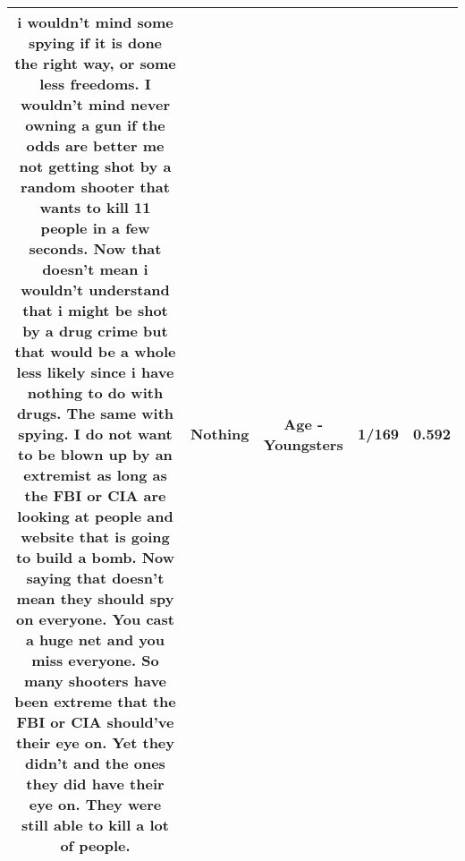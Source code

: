 \documentclass[11pt]{article}
\newlength\mylength
\begin{document}
\begin{center}
\begin{longtable}{|C{.65\mylength}|C{.30\mylength}|C{.12\mylength}|C{.12\mylength}|C{.12\mylength}|}
  \small i wouldn't mind some spying if it is done the right way, or some less freedoms. I wouldn't mind never owning a gun if the odds are better me not getting shot by a random shooter that wants to kill 11 people in a few seconds. Now that doesn't mean i wouldn't understand that i might be shot by a drug crime but that would be a whole less likely since i have \textbf{nothing} to do with drugs. The same with spying. I do not want to be blown up by an extremist as long as the FBI or CIA are looking at people and website that is going to build a bomb. Now saying that doesn't mean they should spy on everyone. You cast a huge net and you miss everyone. So many shooters have been extreme that the FBI or CIA should've their eye on. Yet they didn't and the ones they did have their eye on. They were still able to kill a lot of people.\normalsize   & Nothing & Age - Youngsters & 1/169 & 0.592 \\  \hline

\end{longtable}
\end{center}
\end{document}
